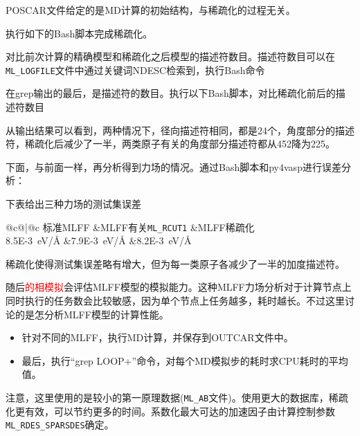 {\textrm{POSCAR}文件给定的是\textrm{MD}计算的初始结构，与稀疏化的过程无关。

执行如下的\textrm{Bash}脚本完成稀疏化。

对比前次计算的精确模型和稀疏化之后模型的描述符数目。描述符数目可以在\texttt{ML\_LOGFILE}文件中通过关键词\textrm{NDESC}检索到，执行\textrm{Bash}命令

在\textrm{grep}输出的最后，是描述符的数目。执行以下\textrm{Bash}脚本，对比稀疏化前后的描述符数目

从输出结果可以看到，两种情况下，径向描述符相同，都是24个，角度部分的描述符，稀疏化后减少了一半，两类原子有关的角度部分描述符都从452降为225。

下面，与前面一样，再分析得到力场的情况。通过\textrm{Bash}脚本和\textrm{py4vasp}进行误差分析：

下表给出三种力场的测试集误差

\begin{table}[h!]
    \centering
    \begin{tabular*}{\textwidth}{@{\extracolsep{\fill}}c@{\extracolsep{\fill}}|@{\extracolsep{\fill}}c}
        \toprule
	标准\textrm{MLFF} &\textrm{MLFF}有关\texttt{ML\_RCUT1} &\textrm{MLFF}稀疏化\\
	\midrule
	\textrm{8.5E-3~eV/\AA} &\textrm{7.9E-3~eV/\AA} &\textrm{8.2E-3~eV/\AA}
        \bottomrule
    \end{tabular*}
    \caption{三种力场的误差分析}
\label{Tab:Test-set_Error-in-Sparcsified}
\end{table}

稀疏化使得测试集误差略有增大，但为每一类原子各减少了一半的加度描述符。

随后\textcolor{red}{的相模拟}会评估\textrm{MLFF}模型的模拟能力。这种\textrm{MLFF}力场分析对于计算节点上同时执行的任务数会比较敏感，因为单个节点上任务越多，耗时越长。不过这里讨论的是怎分析\textrm{MLFF}模型的计算性能。
\begin{itemize}
	，减少计算中的\textrm{I/O}。在\textrm{INCAR.timing}中有如何减少每个\textrm{MD}执行过程中的写磁盘和输出的控制参数方案。为执行计算，将\textrm{INCAR.timing}另存为\textrm{INCAR}，开启\textrm{VASP}计算。
	\item 针对不同的\textrm{MLFF}，执行\textrm{MD}计算，并保存到\textrm{OUTCAR}文件中。
	\item 最后，执行``\textrm{grep LOOP+}''命令，对每个\textrm{MD}模拟步的耗时求\textrm{CPU}耗时的平均值。%
\end{itemize}
注意，这里使用的是较小的第一原理数据(\texttt{ML\_AB}文件)。使用更大的数据库，稀疏化更有效，可以节约更多的时间。系数化最大可达的加速因子由计算控制参数\texttt{ML\_RDES\_SPARSDES}确定。

}
